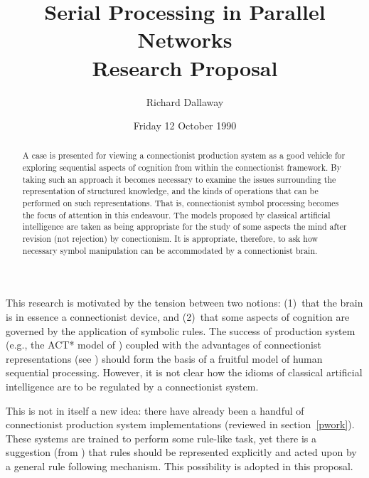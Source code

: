 

\author{Richard Dallaway}
\date{Friday 12 October 1990}
\title{Serial Processing in Parallel Networks\medskip\\Research
Proposal}
\maketitle

\begin{abstract}

A case is presented for viewing a connectionist production system as a
good vehicle for exploring sequential aspects of cognition from within
the connectionist framework.  By taking such an approach it becomes
necessary to examine the issues surrounding the representation of
structured knowledge, and the kinds of operations that can be
performed on such representations.  That is, connectionist symbol
processing becomes the focus of attention in this endeavour. The
models proposed by classical artificial intelligence are taken as
being appropriate for the study of some aspects the mind after
revision (not rejection) by conectionism. It is appropriate,
therefore, to ask how necessary symbol manipulation can be
accommodated by a connectionist brain.

\end{abstract}

\pagethrow
\tableofcontents
\pagethrow





This research is motivated by the tension between two notions:
(1)~that the brain is in essence a connectionist device, and
(2)~that some aspects of cognition are governed by the application
of symbolic rules.  The success of production system (e.g., the
ACT* model of ) coupled with the advantages of
connectionist representations (see ) should form the
basis of a fruitful model of human sequential processing.  However,
it is not clear how the idioms of classical artificial
intelligence are to be regulated by a connectionist system.

This is not in itself a new idea: there have already been a
handful of connectionist production system implementations
(reviewed in section~\ref{pwork}).  These systems are trained to
perform some rule-like task, yet there is a suggestion (from
) that rules should be represented explicitly and
acted upon by a general rule following mechanism.  This
possibility is adopted in this proposal.

